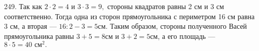 249. Так как $2\cdot2=4$ и $3\cdot3=9,$ стороны квадратов равны 2 см и 3 см соответственно. Тогда одна из сторон прямоугольника с периметром 16 см равна 3 см, а вторая --- $16:2-3=5$см. Таким образом, стороны полученного Васей прямоугольника равны $3+5=8$см и $3+2=5$см, а его площадь --- $8\cdot5=40\text{ см}^2.$\\
